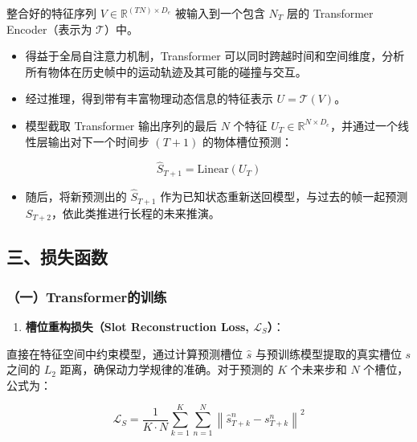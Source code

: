 整合好的特征序列 \(V \in \mathbb{R}^{(TN)\times D_e}\) 被输入到一个包含 \(N_T\) 层的 Transformer Encoder（表示为 \(\mathcal{T}\)）中。

\begin{itemize}
\tightlist
\item
  得益于全局自注意力机制，Transformer 可以同时跨越时间和空间维度，分析所有物体在历史帧中的运动轨迹及其可能的碰撞与交互。
\item
  经过推理，得到带有丰富物理动态信息的特征表示 \(U = \mathcal{T}(V)\)。
\item
  模型截取 Transformer 输出序列的最后 \(N\) 个特征 \(U_T \in \mathbb{R}^{N\times D_e}\)，并通过一个线性层输出对下一个时间步 \((T+1)\) 的物体槽位预测：
\end{itemize}

\[
\hat{S}_{T+1} = \mathrm{Linear}(U_T)
\]

\begin{itemize}
\tightlist
\item
  随后，将新预测出的 \(\hat{S}_{T+1}\) 作为已知状态重新送回模型，与过去的帧一起预测 \(S_{T+2}\)，依此类推进行长程的未来推演。
\end{itemize}

\hypertarget{ux4e09ux635fux5931ux51fdux6570-2}{%
\subsection{三、损失函数}\label{ux4e09ux635fux5931ux51fdux6570-2}}

\hypertarget{ux4e00transformerux7684ux8badux7ec3}{%
\subsubsection{（一）Transformer的训练}\label{ux4e00transformerux7684ux8badux7ec3}}

\begin{enumerate}
\def\labelenumi{\arabic{enumi}.}
\tightlist
\item
  \textbf{槽位重构损失（Slot Reconstruction Loss, \(\mathcal{L}_S\)）}：
\end{enumerate}

直接在特征空间中约束模型，通过计算预测槽位 \(\hat{s}\) 与预训练模型提取的真实槽位 \(s\) 之间的 \(L_2\) 距离，确保动力学规律的准确。对于预测的 \(K\) 个未来步和 \(N\) 个槽位，公式为：

\[
\mathcal{L}_S = \frac{1}{K \cdot N}\sum_{k=1}^{K}\sum_{n=1}^{N}\left\lVert \hat{s}_{T+k}^{n} - s_{T+k}^{n} \right\rVert^2
\]

